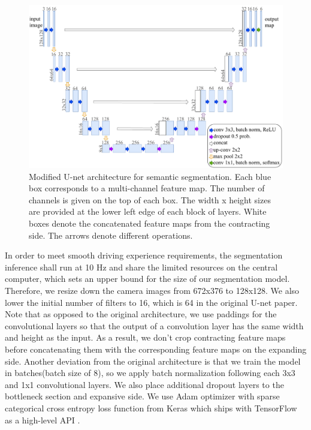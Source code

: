 \begin{figure}[h]
  \centering
  \includegraphics[width=1.0\textwidth]{figures/unet-architecture.pdf}
  \caption{Modified U-net architecture for semantic segmentation. Each blue box
    corresponds to a multi-channel feature map. The number of channels is
    given on the top of each box. The width x height sizes are provided at the
    lower left edge of each block of layers. White boxes denote the
    concatenated feature maps from the contracting side. The arrows denote
    different operations.}
  \label{figure:unet-architecture}
\end{figure}

In order to meet smooth driving experience requirements, the segmentation
inference shall run at 10 Hz and share the limited resources on the central
computer, which sets an upper bound for the size of our segmentation model.
Therefore, we resize down the camera images from 672x376 to 128x128. We also
lower the initial number of filters to 16, which is 64 in the original U-net
paper. Note that as opposed to the original architecture, we use paddings for
the convolutional layers so that the output of a convolution layer has the same
width and height as the input. As a result, we don't crop contracting feature
maps before concatenating them with the corresponding feature maps on the
expanding side. Another deviation from the original architecture is that we
train the model in batches(batch size of 8), so we apply batch normalization
following each 3x3 and 1x1 convolutional layers. We also place additional
dropout layers to the bottleneck section and expansive side. We use Adam
optimizer with sparse categorical cross entropy loss function from Keras which
ships with TensorFlow as a high-level API \cite{Abadi2015TF, Chollet2015Keras}.

